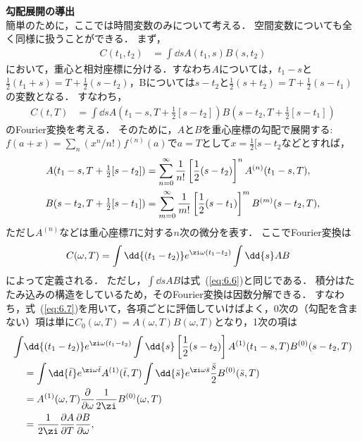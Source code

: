 \documentclass[a4paper,10pt]{jsarticle}
\begin{document}
\textbf{勾配展開の導出}\\
簡単のために，ここでは時間変数のみについて考える．
空間変数についても全く同様に扱うことができる．
まず，
\begin{align*}
C (t_1, t_2)
	& = \int \dd{s} A (t_1, s) B (s, t_2)
\end{align*}
において，重心と相対座標に分ける．すなわち$A$については，$t_1 - s$と$\tfrac{1}{2} (t_1 + s) = T + \tfrac{1}{2} (s - t_2)$，Bについては$s - t_2$と$\tfrac{1}{2} (s + t_2) = T + \tfrac{1}{2} (s - t_1)$の変数となる．
すなわち，
\begin{align}
C (t, T)
	& = \int \dd{s} A (t_1 -s, T + \tfrac{1}{2} [s - t_2]) B (s - t_2, T + \tfrac{1}{2} [s - t_1])
\label{eq:6.6}
\end{align}
のFourier変換を考える．
そのために，$A$と$B$を重心座標の勾配で展開する: $f (a + x) = \sum_n (x^n / n!) f^{(n)} (a)$で$a = T$として$x = \tfrac{1}{2} [s - t_2$などとすれば，
\begin{align}
A (t_1 - s, T + \tfrac{1}{2} [s - t_2])
	& = \sum_{n = 0}^{\infty} \frac{1}{n!} \left[ \frac{1}{2} (s - t_2) \right]^n A^{(n)} (t_1 - s, T)
, \notag \\
B (s - t_2, T + \tfrac{1}{2} [s - t_1])
	& = \sum_{m = 0}^{\infty} \frac{1}{m!} \left[ \frac{1}{2} (s - t_1) \right]^m B^{(m)} (s - t_2, T)
\label{eq:6.7}
,\end{align}
ただし$A^{(n)}$などは重心座標$T$に対する$n$次の微分を表す．
ここでFourier変換は
\begin{align}
C (\omega, T)
	& = \int \dd{(t_1 - t_2)} e^{\zi \omega (t_1 - t_2)} \int \dd{s} A B
\end{align}
によって定義される．
ただし，$\int \dd{s} A B$は式~(\ref{eq:6.6})と同じである．
積分はたたみ込みの構造をしているため，そのFourier変換は因数分解できる．
すなわち，式~(\ref{eq:6.7})を用いて，各項ごとに評価していけばよく，0次の（勾配を含まない）項は単に$C_0 (\omega, T) = A (\omega, T) B (\omega, T)$となり，1次の項は
\begin{align*}
\int & \dd{(t_1 - t_2)} e^{\zi \omega (t_1 - t_2)}
		\int \dd{s} \left[ \frac{1}{2} (s - t_2) \right] A^{(1)} (t_1 - s, T) B^{(0)} (s - t_2, T)
\\	& = \int \dd{\bar{t}} e^{\zi \omega \bar{t}} A^{(1)} (\bar{t}, T) \int \dd{\bar{s}} e^{\zi \omega \bar{s}} \frac{\bar{s}}{2} B^{(0)} (\bar{s}, T)
\\
	& = A^{(1)} (\omega, T) \frac{\partial}{\partial \omega} \frac{1}{2 \zi} B^{(0)} (\omega, T)
\\
	& = \frac{1}{2 \zi} \frac{\partial A}{\partial T} \frac{\partial B}{\partial \omega}
,\end{align*}
\end{document}
